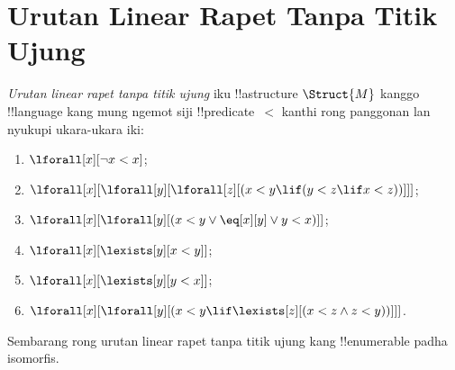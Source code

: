 \documentclass[../../../include/open-logic-section]{subfiles}
\begin{document}
\section{Urutan Linear Rapet Tanpa Titik Ujung}

\begin{defn}
  \emph{Urutan linear rapet tanpa titik ujung}
  iku !!a{structure} $\Struct{M}$
  kanggo !!{language} kang mung ngemot
  siji !!{predicate}~$<$ kanthi
  rong panggonan lan nyukupi
  ukara-ukara iki:
  \begin{enumerate}
  \item $\lforall[x][\lnot x < x]$;
  \item $\lforall[x][\lforall[y][\lforall[z][(x < y \lif (y < z \lif x
    <z ))]]]$;
  \item $\lforall[x][\lforall[y][(x< y \lor \eq[x][y] \lor y < x)]]$;
  \item $\lforall[x][\lexists[y][x < y]]$;
  \item $\lforall[x][\lexists[y][y < x]]$;
  \item $\lforall[x][\lforall[y][(x < y \lif \lexists[z][(x < z \land
        z < y))]]]$.
 \end{enumerate}
\end{defn}

\begin{thm}
  Sembarang rong urutan linear rapet
  tanpa titik ujung kang !!{enumerable}
  padha isomorfis.
\end{thm}
\end{document}
